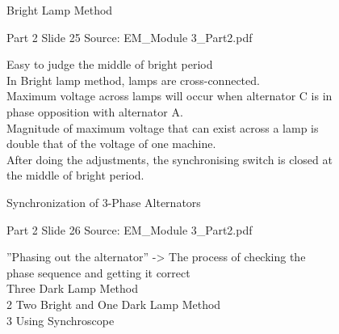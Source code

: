 \documentclass[11pt,a4paper]{article}
\begin{document}
\begin{mdframed}[roundcorner=9pt,backgroundcolor=white,linecolor=anthGreen,linewidth=1pt,innerleftmargin=12pt,innerrightmargin=12pt,innertopmargin=10pt,innerbottommargin=10pt,skipabove=8pt,skipbelow=10pt]
{\HeadingFont\fontsize{15}{18}\selectfont\color{anthDark}Bright Lamp Method\par}
{\color{anthMid}\small Part 2 \textbullet{} Slide 25 \textbullet{} Source: EM\_Module 3\_Part2.pdf\par}
\vspace{0.5em}
{\small
Easy to judge the middle of bright period\\
In Bright lamp method, lamps are cross-connected.\\
Maximum voltage across lamps will occur when alternator C is in\\
phase opposition with alternator A.\\
Magnitude of maximum voltage that can exist across a lamp is\\
double that of the voltage of one machine.\\
After doing the adjustments, the synchronising switch is closed at\\
the middle of bright period.\\

}
\end{mdframed}

\begin{mdframed}[roundcorner=9pt,backgroundcolor=white,linecolor=anthOrange,linewidth=1pt,innerleftmargin=12pt,innerrightmargin=12pt,innertopmargin=10pt,innerbottommargin=10pt,skipabove=8pt,skipbelow=10pt]
{\HeadingFont\fontsize{15}{18}\selectfont\color{anthDark}Synchronization of 3-Phase Alternators\par}
{\color{anthMid}\small Part 2 \textbullet{} Slide 26 \textbullet{} Source: EM\_Module 3\_Part2.pdf\par}
\vspace{0.5em}
{\small
”Phasing out the alternator” -> The process of checking the\\
phase sequence and getting it correct\\
   Three Dark Lamp Method\\
2   Two Bright and One Dark Lamp Method\\
3   Using Synchroscope\\

}
\end{mdframed}
\end{document}
